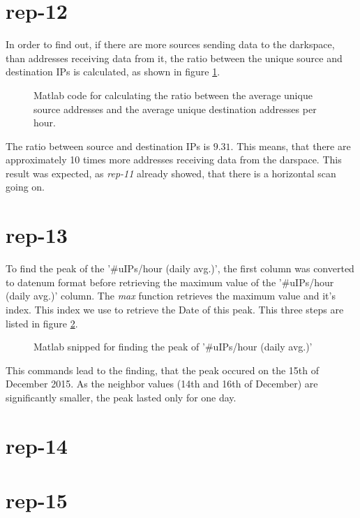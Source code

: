 \section*{rep-12}
In order to find out, if there are more sources sending data to the darkspace, than addresses receiving data from it, the ratio between the unique source and destination IPs is calculated, as shown in figure \ref{fig:ratio_source_destination_ip}.

\begin{figure}[H]

\caption{Matlab code for calculating the ratio between the average unique source addresses and the average unique destination addresses per hour.}
\label{fig:ratio_source_destination_ip}
\end{figure}

The ratio between source and destination IPs is $9.31$. This means, that there are approximately 10 times more addresses receiving data from the darspace. This result was expected, as \textit{rep-11} already showed, that there is a horizontal scan going on.

\section*{rep-13}
To find the peak of the '\#uIPs/hour (daily avg.)', the first column was converted to datenum format before retrieving the maximum value of the '\#uIPs/hour (daily avg.)' column. The \textit{max} function retrieves the maximum value and it's index. This index we use to retrieve the Date of this peak. This three steps are listed in figure \ref{fig:find_peak}.

\begin{figure}[H]

\caption{Matlab snipped for finding the peak of '\#uIPs/hour (daily avg.)'}
\label{fig:find_peak}
\end{figure}

This commands lead to the finding, that the peak occured on the 15th of December 2015. As the neighbor values (14th and 16th of December) are significantly smaller, the peak lasted only for one day.

\section*{rep-14}

\section*{rep-15}


